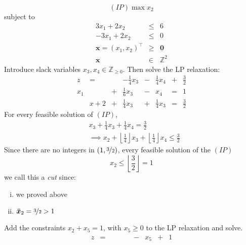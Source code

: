 \begin{exbox}
    \begin{example}
        \[ (IP) \max x_2 \]
        subject to
        \[
            \begin{array}{ccc}
                3x_1+2x_2             & \leqslant & 6            \\
                -3x_1+2x_2            & \leqslant & 0            \\
                \bm{x}=(x_1,x_2)^\top & \geqslant & \bm{0}       \\
                \bm{x}                & \in       & \mathbb{Z}^2
            \end{array}
        \]
        Introduce slack variables $ x_3, x_4\in\mathbb{Z}_{\geqslant 0} $.
        Then solve the LP relaxation:
        \[
            \begin{array}{cccccccc}
                z   & =   &   & -\frac{1}{4} x_3 & - & \frac{1}{4} x_4 & + & \frac{3}{2} \\
                x_1 &     & + & \frac{1}{6} x_3  & - & x_4             & = & 1           \\
                    & x+2 & + & \frac{1}{4} x_3  & + & \frac{1}{4} x_3 & = & \frac{3}{2}
            \end{array}
        \]
        For every feasible solution of $ (IP) $,
        \begin{align*}
             & x_3+\frac{1}{4} x_3+ \frac{1}{4} x_4 = \frac{3}{2}                                                                          \\
             & \implies x_2 + \left\lfloor \frac{1}{4} \right\rfloor x_3 + \left\lfloor \frac{1}{4} \right\rfloor x_4\leqslant \frac{3}{2}
        \end{align*}
        Since there are no integers in $ (1,\nicefrac{3}{2}) $, every feasible solution of the $ (IP) $
        \[ x_2\leqslant \left\lfloor \frac{3}{2} \right\rfloor=1 \]
        we call this a \emph{cut} since:
        \begin{enumerate}[(i)]
            \item we proved above
            \item $ \bm{\bar{x}}_2=\nicefrac{3}{2}>1  $
        \end{enumerate}
        Add the constraints $ x_2+x_5=1 $, with $ x_5\geqslant 0 $ to the LP relaxation and solve.
        \[
            \begin{array}{cccccccccc}
                z   & = &     &     &   &                 & - & x_5             & + & 1           \\

\end{array}\]
\end{example}
\end{exbox}
